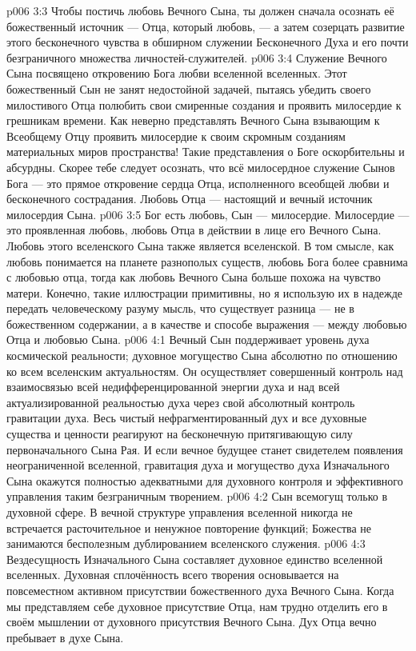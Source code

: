 \vs p006 3:3 Чтобы постичь любовь Вечного Сына, ты должен сначала осознать её божественный источник --- Отца, который  любовь, --- а затем созерцать развитие этого бесконечного чувства в обширном служении Бесконечного Духа и его почти безграничного множества личностей\hyp{}служителей.
\vs p006 3:4 Служение Вечного Сына посвящено откровению Бога любви вселенной вселенных. Этот божественный Сын не занят недостойной задачей, пытаясь убедить своего милостивого Отца полюбить свои смиренные создания и проявить милосердие к грешникам времени. Как неверно представлять Вечного Сына взывающим к Всеобщему Отцу проявить милосердие к своим скромным созданиям материальных миров пространства! Такие представления о Боге оскорбительны и абсурдны. Скорее тебе следует осознать, что всё милосердное служение Сынов Бога --- это прямое откровение сердца Отца, исполненного всеобщей любви и бесконечного сострадания. Любовь Отца --- настоящий и вечный источник милосердия Сына.
\vs p006 3:5 Бог есть любовь, Сын --- милосердие. Милосердие --- это проявленная любовь, любовь Отца в действии в лице его Вечного Сына. Любовь этого вселенского Сына также является вселенской. В том смысле, как любовь понимается на планете разнополых существ, любовь Бога более сравнима с любовью отца, тогда как любовь Вечного Сына больше похожа на чувство матери. Конечно, такие иллюстрации примитивны, но я использую их в надежде передать человеческому разуму мысль, что существует разница --- не в божественном содержании, а в качестве и способе выражения --- между любовью Отца и любовью Сына.
\vs p006 4:1 Вечный Сын поддерживает уровень духа космической реальности; духовное могущество Сына абсолютно по отношению ко всем вселенским актуальностям. Он осуществляет совершенный контроль над взаимосвязью всей недифференцированной энергии духа и над всей актуализированной реальностью духа через свой абсолютный контроль гравитации духа. Весь чистый нефрагментированный дух и все духовные существа и ценности реагируют на бесконечную притягивающую силу первоначального Сына Рая. И если вечное будущее станет свидетелем появления неограниченной вселенной, гравитация духа и могущество духа Изначального Сына окажутся полностью адекватными для духовного контроля и эффективного управления таким безграничным творением.
\vs p006 4:2 \pc Сын всемогущ только в духовной сфере. В вечной структуре управления вселенной никогда не встречается расточительное и ненужное повторение функций; Божества не занимаются бесполезным дублированием вселенского служения.
\vs p006 4:3 \pc Вездесущность Изначального Сына составляет духовное единство вселенной вселенных. Духовная сплочённость всего творения основывается на повсеместном активном присутствии божественного духа Вечного Сына. Когда мы представляем себе духовное присутствие Отца, нам трудно отделить его в своём мышлении от духовного присутствия Вечного Сына. Дух Отца вечно пребывает в духе Сына.
